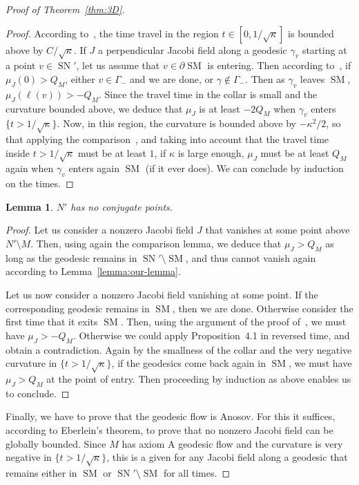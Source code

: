 \documentclass[10pt]{amsart}
\newtheorem{lemm}[theo]{Lemma}\newtheorem{prop}[theo]{Proposition}\newtheorem{coro}[theo]{Corollary}\newtheorem{conj}[theo]{Conjecture}
\theoremstyle{definition}\newtheorem{defi}[theo]{Definition}\newtheorem{rema}[theo]{Remark}\newtheorem{exam}[theo]{Example}\newtheorem{exem}[theo]{Example}\newtheorem{nota}[theo]{Notation}
\DeclareMathOperator{\SM}{SM}
\DeclareMathOperator{\SN}{SN}
\theoremstyle{plain}
\begin{document}
\begin{proof}[Proof of Theorem~\ref{thm:3D}]
\begin{proof}
According to~\cite[Lemma~8.5]{Chen-Erchenko-Gogolev}, the time travel in the region $t\in [0,1/\sqrt{\kappa}]$ is bounded above by $C/\sqrt{\kappa}$. If $J$ a perpendicular Jacobi field along a geodesic $\gamma_v$ starting at a point $v\in \SN'$, let us assume that $v\in \partial \SM$ is entering. Then according to~\cite[Proposition~4.1]{Chen-Erchenko-Gogolev}, if $\mu_J(0) > Q_M$, either $v\in\Gamma_-$ and we are done, or $\gamma\notin \Gamma_-$. Then as $\gamma_v$ leaves $\SM$, $\mu_J(\ell(v)) > - Q_M$. Since the travel time in the collar is small and the curvature bounded above, we deduce that $\mu_J$ is at least $-2Q_M$ when $\gamma_v$ enters $\{t>1/\sqrt{\kappa}\}$. Now, in this region, the curvature is bounded above by $-\kappa^2/2$, so that applying the comparison~\cite[Lemma~2.8]{Chen-Erchenko-Gogolev}, and taking into account that the travel time inside $t>1/\sqrt{\kappa}$ must be at least $1$, if $\kappa$ is large enough, $\mu_J$ must be at least $Q_M$ again when $\gamma_v$ enters again $\SM$ (if it ever does). We can conclude by induction on the times.
\end{proof}

\begin{lemm}
$N'$ has no conjugate points.
\end{lemm}

\begin{proof}
Let us consider a nonzero Jacobi field $J$ that vanishes at some point above $N'\setminus M$. Then, using again the comparison lemma, we deduce that $\mu_J> Q_M$ as long as the geodesic remains in $\SN'\setminus \SM$, and thus cannot vanish again according to Lemma~\ref{lemma:our-lemma}.

Let us now consider a nonzero Jacobi field vanishing at some point. If the corresponding geodesic remains in $\SM$, then we are done. Otherwise consider the first time that it exits $\SM$. Then, using the argument of the proof of~\cite[Lemma~8.11]{Chen-Erchenko-Gogolev}, we must have $\mu_J> - Q_M$. Otherwise we could apply Proposition~4.1 in reversed time, and obtain a contradiction. Again by the smallness of the collar and the very negative curvature in $\{t>1/\sqrt{\kappa}\}$, if the geodesics come back again in $\SM$, we must have $\mu_J> Q_M$ at the point of entry. Then proceeding by induction as above enables us to conclude.
\end{proof}

Finally, we have to prove that the geodesic flow is Anosov. For this it suffices, according to Eberlein's theorem, to prove that no nonzero Jacobi field can be globally bounded. Since $M$ has axiom A geodesic flow and the curvature is very negative in $\{t>1/\sqrt{\kappa}\}$, this is a given for any Jacobi field along a geodesic that remains either in $\SM$ or $\SN'\setminus \SM$ for all times.


\end{proof}
\end{document}
